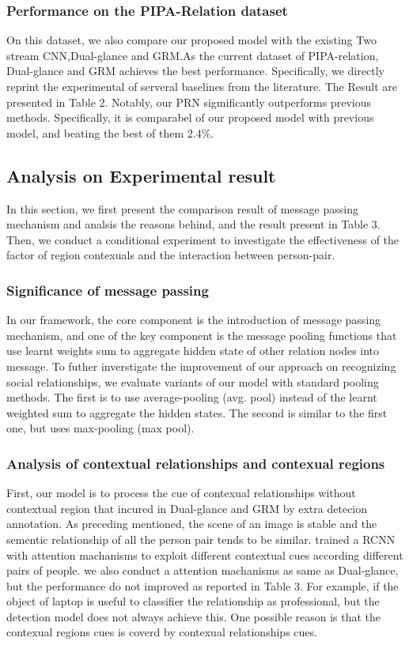 \documentclass{article}
\begin{document}
\subsubsection{Performance on the PIPA-Relation dataset}
On this dataset, we also compare our proposed model with the existing Two stream CNN\cite{DBLP:conf/cvpr/SunSF17},Dual-glance\cite{DBLP:conf/iccv/LiWZK17} and GRM\cite{DBLP:conf/ijcai/WangCRYCL18}.As the current dataset of PIPA-relation, Dual-glance and GRM achieves the best performance. Specifically, we directly reprint the experimental of serveral baselines from the literature. The Result are presented in Table 2. Notably, our PRN sigmificantly outperforms previous methods. Specifically, it is comparabel of our proposed model with previous model, and beating the best of them 2.4\%.  
\subsection{Analysis on Experimental result}

In this section, we first present the comparison result  of message passing mechanism and analsis the reasons behind, and the result present in Table 3.
Then, we conduct a conditional experiment to investigate the effectiveness of 
the factor of region contexuals and the interaction between person-pair.
\subsubsection{Significance of message passing}

In our framework, the core component is the introduction of message passing mechanism, and one of the key component is the message pooling functions that use learnt weights sum to aggregate hidden state of other relation nodes into message. To futher inverstigate the improvement of our approach on recognizing social relationships, we evaluate variants of our model
with standard pooling methods. The first is to use average-pooling (avg. pool) instead of the learnt weighted sum to
aggregate the hidden states. The second is similar to the first
one, but uses max-pooling (max pool).

\subsubsection{Analysis of contextual relationships and contexual regions}

First, our model is to process the cue of contexual relationships without contextual region that incured in Dual-glance and GRM by extra detecion annotation. As preceding mentioned, the scene of an image is stable and the sementic relationship of all the person pair tends to be similar.
 \cite{DBLP:conf/iccv/LiWZK17} trained a RCNN with attention machanisms to exploit different contextual cues according different pairs of people. we also conduct a attention machanisms as same as Dual-glance, but the performance do not improved as reported in Table 3. For example, if the object of laptop is useful to classifier the relationship as professional, but  the detection model does not always achieve this. One possible reason is that the contexual regions cues is coverd by contexual relationships cues.
\end{document}
